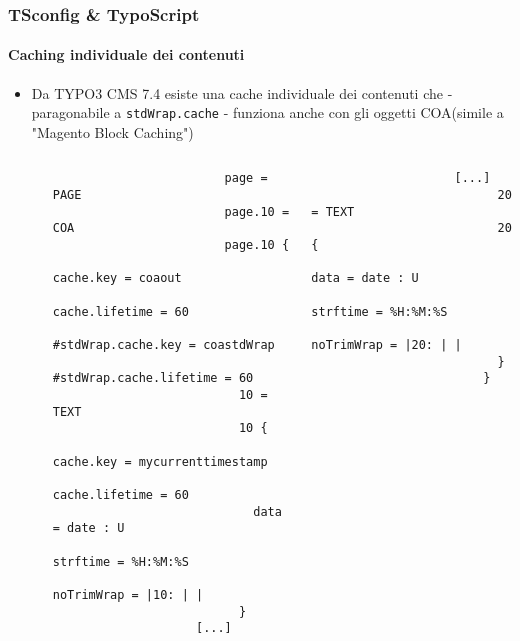 \begin{frame}[fragile]
	\frametitle{TSconfig \& TypoScript}
	\framesubtitle{Caching individuale dei contenuti}

	\lstset{basicstyle=\tiny\ttfamily}

	\begin{itemize}

		\item Da TYPO3 CMS 7.4 esiste una cache individuale dei contenuti che - paragonabile a \texttt{stdWrap.cache} -
			funziona anche con gli oggetti COA\newline(simile a "Magento Block Caching")

			\begin{columns}[T]
				\begin{column}{.07\textwidth}
                \end{column}
				\begin{column}{.465\textwidth}
					\begin{lstlisting}
						page = PAGE
						page.10 = COA
						page.10 {
						  cache.key = coaout
						  cache.lifetime = 60
						  #stdWrap.cache.key = coastdWrap
						  #stdWrap.cache.lifetime = 60
						  10 = TEXT
						  10 {
						    cache.key = mycurrenttimestamp
						    cache.lifetime = 60
						    data = date : U
						    strftime = %H:%M:%S
						    noTrimWrap = |10: | |
						  }
					[...]
					\end{lstlisting}
				\end{column}

				\begin{column}{.465\textwidth}
					\begin{lstlisting}
					[...]
						  20 = TEXT
						  20 {
						    data = date : U
						    strftime = %H:%M:%S
						    noTrimWrap = |20: | |
						  }
						}
					\end{lstlisting}

				\end{column}
			\end{columns}

	\end{itemize}

\end{frame}

